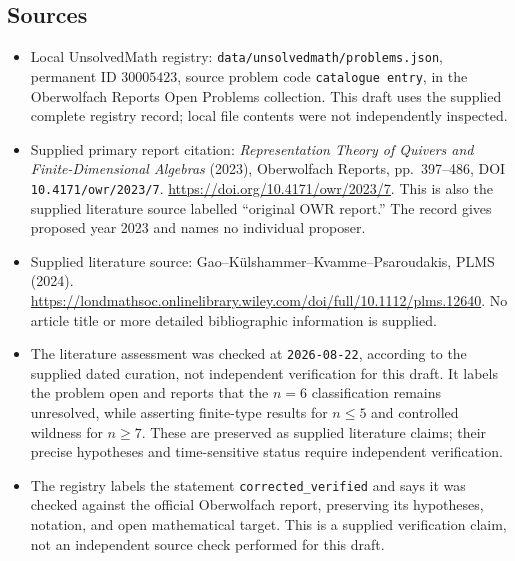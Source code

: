 \documentclass[11pt]{article}
\begin{document}
\subsection{Sources}
\begin{itemize}
\item Local UnsolvedMath registry: \texttt{data/unsolvedmath/problems.json}, permanent ID \(30005423\), source problem code \texttt{catalogue entry}, in the Oberwolfach Reports Open Problems collection. This draft uses the supplied complete registry record; local file contents were not independently inspected.
\item Supplied primary report citation: \emph{Representation Theory of Quivers and Finite-Dimensional Algebras} (2023), Oberwolfach Reports, pp.\ 397--486, DOI \texttt{10.4171/owr/2023/7}. \url{https://doi.org/10.4171/owr/2023/7}. This is also the supplied literature source labelled ``original OWR report.'' The record gives proposed year 2023 and names no individual proposer.
\item Supplied literature source: Gao--K\"ulshammer--Kvamme--Psaroudakis, PLMS (2024). \url{https://londmathsoc.onlinelibrary.wiley.com/doi/full/10.1112/plms.12640}. No article title or more detailed bibliographic information is supplied.
\item The literature assessment was checked at \texttt{2026-08-22}, according to the supplied dated curation, not independent verification for this draft. It labels the problem open and reports that the \(n=6\) classification remains unresolved, while asserting finite-type results for \(n\leq5\) and controlled wildness for \(n\geq7\). These are preserved as supplied literature claims; their precise hypotheses and time-sensitive status require independent verification.
\item The registry labels the statement \texttt{corrected\_verified} and says it was checked against the official Oberwolfach report, preserving its hypotheses, notation, and open mathematical target. This is a supplied verification claim, not an independent source check performed for this draft.
\end{itemize}
\end{document}
